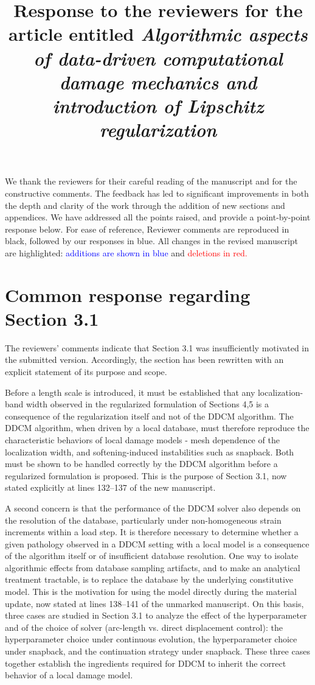 \documentclass[10pt]{article}
\title{Response to the reviewers for the article entitled \textit{Algorithmic aspects of data-driven computational damage mechanics and introduction of Lipschitz regularization}}
\begin{document}
	
\maketitle    



We thank the reviewers for their careful reading of the manuscript and for the constructive comments. The feedback has led to significant improvements in both the depth and clarity of the work through the addition of new sections and appendices. We have addressed all the points raised, and provide a point-by-point response below. For ease of reference, Reviewer comments are reproduced in black, followed by our responses in blue. All changes in the revised manuscript are highlighted: \textcolor{blue}{additions are shown in blue} and \textcolor{red}{deletions in red.}

\color{blue}
\section*{Common response regarding Section 3.1}
The reviewers' comments indicate that Section 3.1 was insufficiently motivated in the submitted version. Accordingly, the section has been rewritten with an explicit statement of its purpose and scope.

Before a length scale is introduced, it must be established that any localization-band width observed in the regularized formulation of Sections 4,5 is a consequence of the regularization itself and not of the DDCM algorithm. The DDCM algorithm, when driven by a local database, must therefore reproduce the characteristic behaviors of local damage models - mesh dependence of the localization width, and softening-induced instabilities such as snapback. Both must be shown to be handled correctly by the DDCM algorithm before a regularized formulation is proposed. This is the purpose of Section 3.1, now stated explicitly at lines 132--137 of the new manuscript.

A second concern is that the performance of the DDCM solver also depends on the resolution of the database, particularly under non-homogeneous strain increments within a load step. It is therefore necessary to determine whether a given pathology observed in a DDCM setting with a local model is a consequence of the algorithm itself or of insufficient database resolution. One way to isolate algorithmic effects from database sampling artifacts, and to make an analytical treatment tractable, is to replace the database by the underlying constitutive model. This is the motivation for using the model directly during the material update, now stated at lines 138--141 of the unmarked manuscript. On this basis, three cases are studied in Section 3.1 to analyze the effect of the hyperparameter and of the choice of solver (arc-length vs. direct displacement control): the hyperparameter choice under continuous evolution, the hyperparameter choice under snapback, and the continuation strategy under snapback. These three cases together establish the ingredients required for DDCM to inherit the correct behavior of a local damage model.
\end{document}
